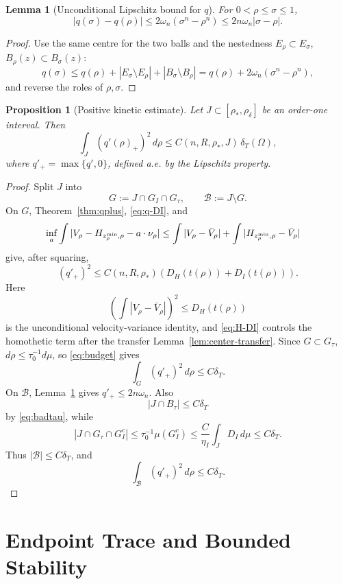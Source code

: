 \documentclass[11pt]{article}
\newtheorem{proposition}[theorem]{Proposition}
\newtheorem{lemma}[theorem]{Lemma}
\theoremstyle{definition}
\newcommand{\rstar}{\rho_*}
\newcommand{\rdel}{\rho_\delta}
\begin{document}
\begin{lemma}[Unconditional Lipschitz bound for \(q\)]\label{lem:qLip}
For \(0<\rho\le\sigma\le1\),
\[
   |q(\sigma)-q(\rho)|
   \le 2\omega_n(\sigma^n-\rho^n)
   \le 2n\omega_n|\sigma-\rho|.
\]
\end{lemma}

\begin{proof}
Use the same centre for the two balls and the nestedness
\(E_\rho\subset E_\sigma\), \(B_\rho(z)\subset B_\sigma(z)\):
\[
   q(\sigma)\le q(\rho)+|E_\sigma\setminus E_\rho|+|B_\sigma\setminus B_\rho|
   =q(\rho)+2\omega_n(\sigma^n-\rho^n),
\]
and reverse the roles of \(\rho,\sigma\).
\end{proof}

\begin{proposition}[Positive kinetic estimate]\label{prop:positivekinetic}
Let \(J\subset[\rstar,\rdel]\) be an order-one interval.  Then
\[
   \int_J (q'(\rho)_+)^2\,d\rho
   \le C(n,R,\rstar,J)\,\delta_T(\Omega),
\]
where \(q'_+=\max\{q',0\}\), defined a.e. by the Lipschitz property.
\end{proposition}

\begin{proof}
Split \(J\) into
\[
   G:=J\cap G_I\cap G_\tau,\qquad
   \mathcal B:=J\setminus G .
\]
On \(G\), Theorem~\ref{thm:qplus}, \eqref{eq:q-DI}, and
\[
\begin{aligned}
   \inf_a\int|V_\rho-H_{z_\rho^{\rm min},\rho}-a\cdot\nu_\rho|
   &\le \int|V_\rho-\bar V_\rho|
        +\int|H_{z_\rho^{\rm min},\rho}-\bar V_\rho|
\end{aligned}
\]
give, after squaring,
\[
   (q'_+)^2
   \le C(n,R,\rstar)(D_H(t(\rho))+D_I(t(\rho))).
\]
Here
\[
   \left(\int|V_\rho-\bar V_\rho|\right)^2\le D_H(t(\rho))
\]
is the unconditional velocity-variance identity, and \eqref{eq:H-DI} controls
the homothetic term after the transfer Lemma~\ref{lem:center-transfer}.
Since \(G\subset G_\tau\), \(d\rho\le\tau_0^{-1}d\mu\),
so \eqref{eq:budget} gives
\[
   \int_G(q'_+)^2\,d\rho\le C\delta_T.
\]
On \(\mathcal B\), Lemma~\ref{lem:qLip} gives \(q'_+\le2n\omega_n\).  Also
\[
   |J\cap B_\tau|\le C\delta_T
\]
by \eqref{eq:badtau}, while
\[
   |J\cap G_\tau\cap G_I^c|
   \le \tau_0^{-1}\mu(G_I^c)
   \le \frac{C}{\eta_I}\int_JD_I\,d\mu
   \le C\delta_T.
\]
Thus \(|\mathcal B|\le C\delta_T\), and
\[
   \int_{\mathcal B}(q'_+)^2\,d\rho\le C\delta_T.
\]
\end{proof}

\section{Endpoint Trace and Bounded Stability}
\end{document}
